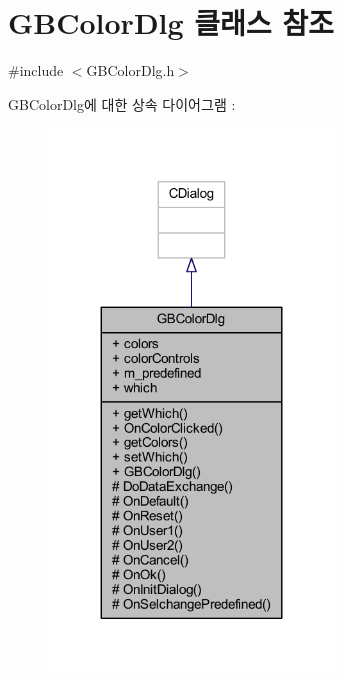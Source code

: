 \hypertarget{class_g_b_color_dlg}{}\section{G\+B\+Color\+Dlg 클래스 참조}
\label{class_g_b_color_dlg}


{\ttfamily \#include $<$G\+B\+Color\+Dlg.\+h$>$}



G\+B\+Color\+Dlg에 대한 상속 다이어그램 \+: \nopagebreak
\begin{figure}[H]
\begin{center}
\leavevmode
\includegraphics[width=215pt]{class_g_b_color_dlg__inherit__graph}
\end{center}
\end{figure}


